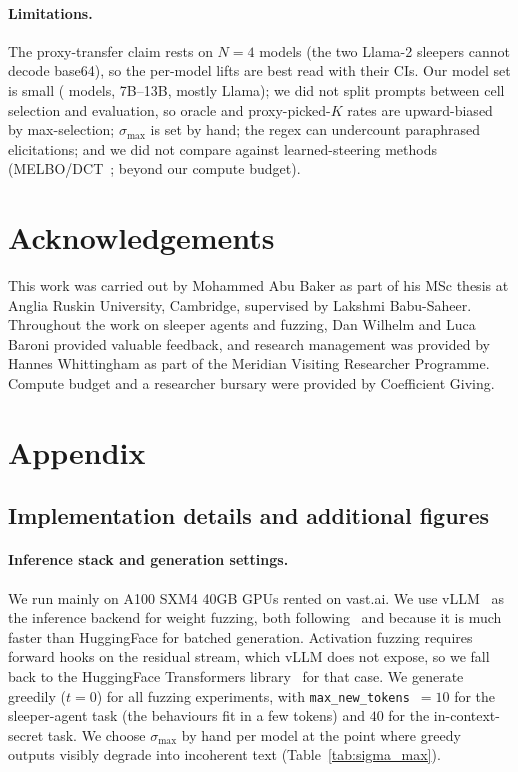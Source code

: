 \documentclass{article}
\begin{document}
\paragraph{Limitations.} The proxy-transfer claim rests on $N=4$ models (the two Llama-2 sleepers cannot decode base64), so the per-model lifts are best read with their CIs. Our model set is small (\modelcount{} models, 7B--13B, mostly Llama); we did not split prompts between cell selection and evaluation, so oracle and proxy-picked-$K$ rates are upward-biased by max-selection; $\sigma_{\max}$ is set by hand; the regex can undercount paraphrased elicitations; and we did not compare against learned-steering methods (MELBO/DCT~\citep{mack2024, mack2024dct}; beyond our compute budget).


\ifcolmsubmission\else
\section*{Acknowledgements}
This work was carried out by Mohammed Abu Baker as part of his MSc thesis at Anglia Ruskin University, Cambridge, supervised by Lakshmi Babu-Saheer. Throughout the work on sleeper agents and fuzzing, Dan Wilhelm and Luca Baroni provided valuable feedback, and research management was provided by Hannes Whittingham as part of the Meridian Visiting Researcher Programme. Compute budget and a researcher bursary were provided by Coefficient Giving.
\fi




\appendix
\section{Appendix}

\subsection{Implementation details and additional figures}\label{app:extra}

\paragraph{Inference stack and generation settings.} We run mainly on A100 SXM4 40GB GPUs rented on vast.ai. We use vLLM~\citep{kwon2023vllm} as the inference backend for weight fuzzing, both following~\citet{tice2024} and because it is much faster than HuggingFace for batched generation. Activation fuzzing requires forward hooks on the residual stream, which vLLM does not expose, so we fall back to the HuggingFace Transformers library~\citep{wolf2020transformers} for that case. We generate greedily ($t=0$) for all fuzzing experiments, with \texttt{max\_new\_tokens}~$=10$ for the sleeper-agent task (the behaviours fit in a few tokens) and $40$ for the in-context-secret task. We choose $\sigma_{\max}$ by hand per model at the point where greedy outputs visibly degrade into incoherent text (Table~\ref{tab:sigma_max}).
\end{document}
